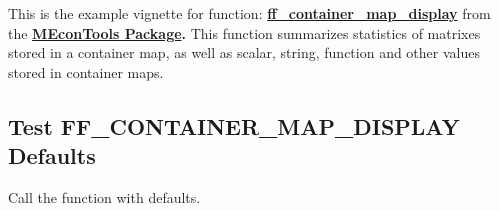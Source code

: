 \documentclass[
]{book}
\begin{document}
This is the example vignette for function:
\href{https://github.com/FanWangEcon/MEconTools/blob/master/MEconTools/tools/ff_container_map_display.m}{\textbf{ff\_container\_map\_display}}
from the \href{https://fanwangecon.github.io/MEconTools/}{\textbf{MEconTools
Package}}\textbf{.} This function
summarizes statistics of matrixes stored in a container map, as well as
scalar, string, function and other values stored in container maps.

\hypertarget{test-ff_container_map_display-defaults}{%
\subsection{Test FF\_CONTAINER\_MAP\_DISPLAY Defaults}\label{test-ff_container_map_display-defaults}}

Call the function with defaults.
\end{document}
